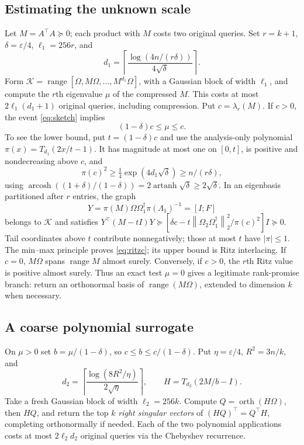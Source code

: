 \documentclass[11pt]{article}
\numberwithin{equation}{section}
\theoremstyle{remark}\newtheorem{remark}[theorem]{Remark}
\newcommand{\eps}{\varepsilon}
\newcommand{\norm}[1]{\left\lVert #1\right\rVert}
\newcommand{\range}{\operatorname{range}}
\newcommand{\calK}{\mathcal K}
\begin{document}
\subsection{Estimating the unknown scale}
Let $M=A^\top A\succeq0$; each product with $M$ costs two original queries. Set $r=k+1$, $\delta=\eps/4$, $\ell_1=256r$, and
\[
d_1=\left\lceil\frac{\log(4n/(r\delta))}{4\sqrt\delta}\right\rceil.
\]
Form $\calK=\range[\Omega,M\Omega,\ldots,M^{d_1}\Omega]$, with a Gaussian block of width $\ell_1$, and compute the $r$th eigenvalue $\mu$ of the compressed $M$. This costs at most $2\ell_1(d_1+1)$ original queries, including compression. Put $c=\lambda_r(M)$. If $c>0$, the event \eqref{eq:sketch} implies
\begin{equation}\label{eq:ritzc}
(1-\delta)c\le\mu\le c.
\end{equation}
To see the lower bound, put $t=(1-\delta)c$ and use the analysis-only polynomial $\pi(x)=T_{d_1}(2x/t-1)$. It has magnitude at most one on $[0,t]$, is positive and nondecreasing above $c$, and
\[
\pi(c)^2\ge\tfrac14\exp(4d_1\sqrt\delta)\ge n/(r\delta),
\]
using $\operatorname{arcosh}((1+\delta)/(1-\delta))=2\operatorname{artanh}\sqrt\delta\ge2\sqrt\delta$. In an eigenbasis partitioned after $r$ entries, the graph
\[
Y=\pi(M)\Omega\Omega_1^\dagger\pi(\Lambda_1)^{-1}=[I;F]
\]
belongs to $\calK$ and satisfies
$Y^\top(M-tI)Y\succeq[\delta c-t\norm{\Omega_2\Omega_1^\dagger}_2^2/\pi(c)^2]I\succeq0$.
Tail coordinates above $t$ contribute nonnegatively; those at most $t$ have $|\pi|\le1$. The min--max principle proves \eqref{eq:ritzc}; its upper bound is Ritz interlacing. If $c=0$, $M\Omega$ spans $\range M$ almost surely. Conversely, if $c>0$, the $r$th Ritz value is positive almost surely. Thus an exact test $\mu=0$ gives a legitimate rank-promise branch: return an orthonormal basis of $\range(M\Omega)$, extended to dimension $k$ when necessary.

\subsection{A coarse polynomial surrogate}
On $\mu>0$ set $b=\mu/(1-\delta)$, so $c\le b\le c/(1-\delta)$. Put $\eta=\eps/4$, $R^2=3n/k$, and
\[
d_2=\left\lceil\frac{\log(8R^2/\eta)}{2\sqrt\eta}\right\rceil,
\qquad H=T_{d_2}(2M/b-I).
\]
Take a fresh Gaussian block of width $\ell_2=256k$. Compute $Q=\operatorname{orth}(H\Omega)$, then $HQ$, and return the top $k$ \emph{right singular vectors} of $(HQ)^\top=Q^\top H$, completing orthonormally if needed. Each of the two polynomial applications costs at most $2\ell_2d_2$ original queries via the Chebyshev recurrence.
\end{document}
